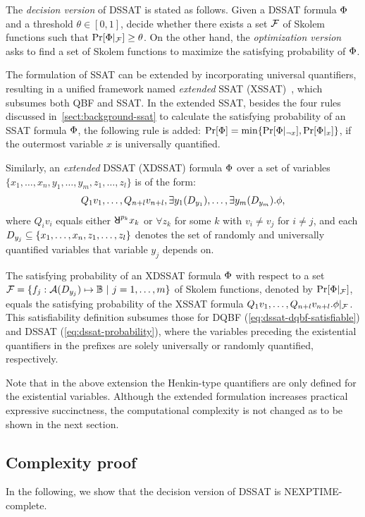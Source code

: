 The \textit{decision version} of DSSAT is stated as follows.
Given a DSSAT formula $\Phi$ and a threshold $\theta\in[0,1]$,
decide whether there exists a set $\mathcal{F}$ of Skolem functions such that $\Pr[\Phi|_{\mathcal{F}}]\geq\theta$.
On the other hand, the \textit{optimization version} asks to find a set of Skolem functions to maximize the satisfying probability of $\Phi$.

The formulation of SSAT can be extended by incorporating universal quantifiers,
resulting in a unified framework named \textit{extended} SSAT (XSSAT)~\cite{SATHandbook-SSAT},
which subsumes both QBF and SSAT.
In the extended SSAT,
besides the four rules discussed in~\cref{sect:background-ssat} to calculate the satisfying probability of an SSAT formula $\Phi$,
the following rule is added:
$\Pr[\Phi]=\min\{\Pr[\Phi|_{\lnot x}],\Pr[\Phi|_{x}]\}$, if the outermost variable $x$ is universally quantified.

Similarly, an \textit{extended} DSSAT (XDSSAT) formula $\Phi$ over a set of variables
$\{x_1,\ldots,x_n,y_1,\ldots,y_m,z_1,\ldots,z_l\}$ is of the form:
\begin{align}\label{eq:dssat-xdssat}
    Q_1 v_1,\ldots,Q_{n+l} v_{n+l},\exists y_1(D_{y_1}),\ldots,\exists y_m(D_{y_m}).\phi,
\end{align}
where $Q_i v_i$ equals either $\random{p_k} x_k$ or $\forall z_k$ for some $k$ with $v_i \neq v_j$ for $i \neq j$,
and each $D_{y_j}\subseteq\{x_1,\ldots,x_n,z_1,\ldots,z_l\}$ denotes the set of randomly and universally quantified variables that variable $y_j$ depends on.

The satisfying probability of an XDSSAT formula $\Phi$
with respect to a set $\skf=\{f_j:\av{\dep{y_j}}\mapsto\booldom\ |\ j=1,\ldots,m\}$ of Skolem functions,
denoted by $\Pr[\Phi|_{\mathcal{F}}]$,
equals the satisfying probability of the XSSAT formula $Q_1 v_1,\ldots,Q_{n+l} v_{n+l}.\phi|_{\mathcal{F}}$.
This satisfiability definition subsumes those for DQBF (\cref{eq:dssat-dqbf-satisfiable}) and DSSAT (\cref{eq:dssat-probability}),
where the variables preceding the existential quantifiers in the prefixes are solely universally or randomly quantified, respectively.

Note that in the above extension the Henkin-type quantifiers are only defined for the existential variables.
Although the extended formulation increases practical expressive succinctness,
the computational complexity is not changed as to be shown in the next section.

\subsection{Complexity proof}
In the following, we show that the decision version of DSSAT is NEXPTIME-complete.

